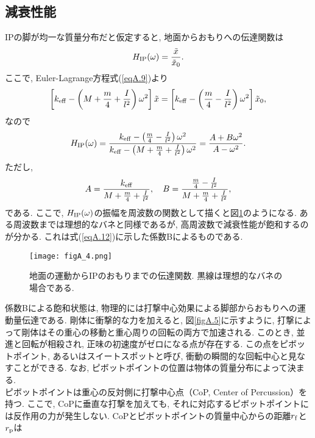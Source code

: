 \subsection{減衰性能}
IPの脚が均一な質量分布だと仮定すると, 地面からおもりへの伝達関数は
\begin{equation}
H_{\rm IP}(\omega)=\frac{\tilde{x}}{\tilde{x}_0}.
\label{eqA.12}
\end{equation}
ここで, Euler-Lagrange方程式(\ref{eqA.9})より
\begin{equation}
\left[k_{\rm eff}-\left(M+\frac{m}{4}+\frac{I}{l^2}\right)\omega^2\right]\tilde{x}=\left[k_{\rm eff}-\left(\frac{m}{4}-\frac{I}{l^2}\right)\omega^2\right]\tilde{x}_0,
\label{eqA.13}
\end{equation}
なので
\begin{equation}
H_{\rm IP}(\omega)=\frac{k_{\rm eff}-\left(\frac{m}{4}-\frac{I}{l^2}\right)\omega^2}{k_{\rm eff}-\left(M+\frac{m}{4}+\frac{I}{l^2}\right)\omega^2}=\frac{A+B\omega^2}{A-\omega^2}.
\end{equation}
ただし, 
\begin{equation}
A=\frac{k_{\rm eff}}{M+\frac{m}{4}+\frac{I}{l^2}},\quad B=\frac{\frac{m}{4}-\frac{I}{l^2}}{M+\frac{m}{4}+\frac{I}{l^2}},
\end{equation}
である. ここで, $H_{\rm IP}(\omega)$の振幅を周波数の関数として描くと図\ref{figA.4}のようになる. ある周波数までは理想的なバネと同様であるが, 高周波数で減衰性能が飽和するのが分かる. これは式(\ref{eqA.12})に示した係数Bによるものである. 
\begin{figure}[H]
\begin{center}
\texttt{[image: figA\_4.png]} 
\caption[地面の運動からIPのおもりまでの伝達関数]{地面の運動からIPのおもりまでの伝達関数. 黒線は理想的なバネの場合である. }
\label{figA.4}
\end{center}
\end{figure}
係数Bによる飽和状態は, 物理的には打撃中心効果\cite{cop}による脚部からおもりへの運動量伝達である. 剛体に衝撃的な力を加えると, 図\ref{figA.5}に示すように, 打撃によって剛体はその重心の移動と重心周りの回転の両方で加速される. このとき, 並進と回転が相殺され, 正味の初速度がゼロになる点が存在する. この点をピボットポイント, あるいはスイートスポットと呼び, 衝動の瞬間的な回転中心と見なすことができる. なお, ピボットポイントの位置は物体の質量分布によって決まる. \\
\quad ピボットポイントは重心の反対側に打撃中心点（CoP, Center of Percussion）を持つ. ここで, CoPに垂直な打撃を加えても, それに対応するピボットポイントには反作用の力が発生しない. CoPとピボットポイントの質量中心からの距離$r_{\rm f}$と$r_{\rm p}$は
